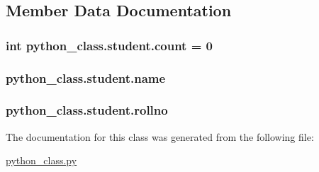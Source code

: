 \subsection{Member Data Documentation}
\hypertarget{classpython__class_1_1student_a2db4ae87725425fb6fa3711bf212e636}{
\subsubsection[{count}]{\setlength{\rightskip}{0pt plus 5cm}int python\-\_\-class.\-student.\-count = 0\hspace{0.3cm}{\ttfamily [static]}}}\label{classpython__class_1_1student_a2db4ae87725425fb6fa3711bf212e636}
\hypertarget{classpython__class_1_1student_a473a4ab52914d49597c66da2e05ba913}{
\subsubsection[{name}]{\setlength{\rightskip}{0pt plus 5cm}python\-\_\-class.\-student.\-name}}\label{classpython__class_1_1student_a473a4ab52914d49597c66da2e05ba913}
\hypertarget{classpython__class_1_1student_a62d711e507331eca1d07fd2dce3a327d}{
\subsubsection[{rollno}]{\setlength{\rightskip}{0pt plus 5cm}python\-\_\-class.\-student.\-rollno}}\label{classpython__class_1_1student_a62d711e507331eca1d07fd2dce3a327d}


The documentation for this class was generated from the following file\-:\begin{DoxyCompactItemize}
\item 
\hyperlink{python__class_8py}{python\-\_\-class.\-py}\end{DoxyCompactItemize}
